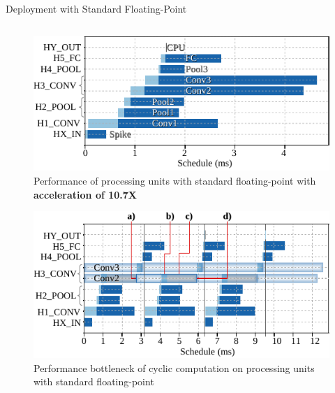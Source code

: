 \begin{frame}{Deployment with Standard Floating-Point}
\begin{columns}
		\begin{column}{0.5\textwidth}
			\begin{minipage}[c][.45\textheight][c]{\linewidth}
				\centering
				\begin{figure}
				\includegraphics[width=0.75\linewidth]{../chapters/sbs_accelerator/figures/latency_pu_fp.pdf} %
				\caption{Performance of processing units with standard floating-point with \textbf{acceleration of 10.7X} }
				\end{figure}
				\pause
			\end{minipage}
			
			\begin{minipage}[c][.45\textheight][c]{\linewidth}
				\centering
				\begin{figure}
				\includegraphics[width=0.75\linewidth]{../chapters/sbs_accelerator/figures/latency_fp_cycle.pdf} %
				\caption{Performance bottleneck of cyclic computation on processing units with standard floating-point}
				\end{figure}
			\end{minipage}
		\end{column}
	\end{columns}
\end{frame}

